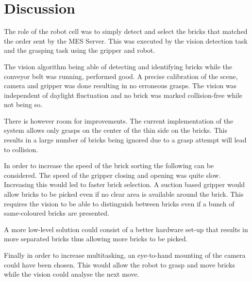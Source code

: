 \chapter{Discussion}\label{chap:discussion}

The role of the robot cell was to simply detect and select the bricks that matched the order sent by the MES Server. This was executed by the vision detection task and the grasping task using the gripper and robot. 

The vision algorithm being able of detecting and identifying bricks while the conveyor belt was running, performed good. A precise calibration of the scene, camera and gripper was done resulting in no erroneous grasps. The vision was independent of daylight fluctuation and no brick was marked collision-free while not being so.

There is however room for improvements. The current implementation of the system allows only grasps on the center of the thin side on the bricks. This results in a large number of bricks being ignored due to a grasp attempt will lead to collision. 

In order to increase the speed of the brick sorting the following can be considered. 
The speed of the gripper closing and opening was quite slow. Increasing this would led to faster brick selection. 
A suction based gripper would allow bricks to be picked even if no clear area is available around the brick. This requires the vision to be able to distinguish between bricks even if a bunch of same-coloured bricks are presented. 

A more low-level solution could consist of a better hardware set-up that results in more separated bricks thus allowing more bricks to be picked. 

Finally in order to increase multitasking, an eye-to-hand mounting of the camera could have been chosen. This would allow the robot to grasp and move bricks while the vision could analyse the next move. 




